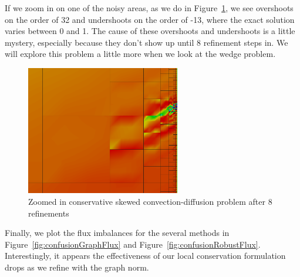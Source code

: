 \documentclass[letterpaper]{article}
\begin{document}
If we zoom in on one of the noisy areas, as we do in
Figure~\ref{fig:confusionRobust8c_zoom}, we see overshoots on the order of 32
and undershoots on the order of -13, where the exact solution varies between 0
and 1. The cause of these overshoots and undershoots is a little mystery,
especially because they don't show up until 8 refinement steps in. We will
explore this problem a little more when we look at the wedge problem.

\begin{figure}[h!]
\centering
\includegraphics[width=0.6\textwidth]{figs/Confusion/robust8c_zoom.png}
\caption{Zoomed in conservative skewed convection-diffusion problem after 8
refinements}
\label{fig:confusionRobust8c_zoom}
\end{figure}

Finally, we plot the flux imbalances for the several methods in
Figure~\ref{fig:confusionGraphFlux} and Figure~\ref{fig:confusionRobustFlux}.
Interestingly, it appears the effectiveness of our local conservation
formulation drops as we refine with the graph norm.
\end{document}
